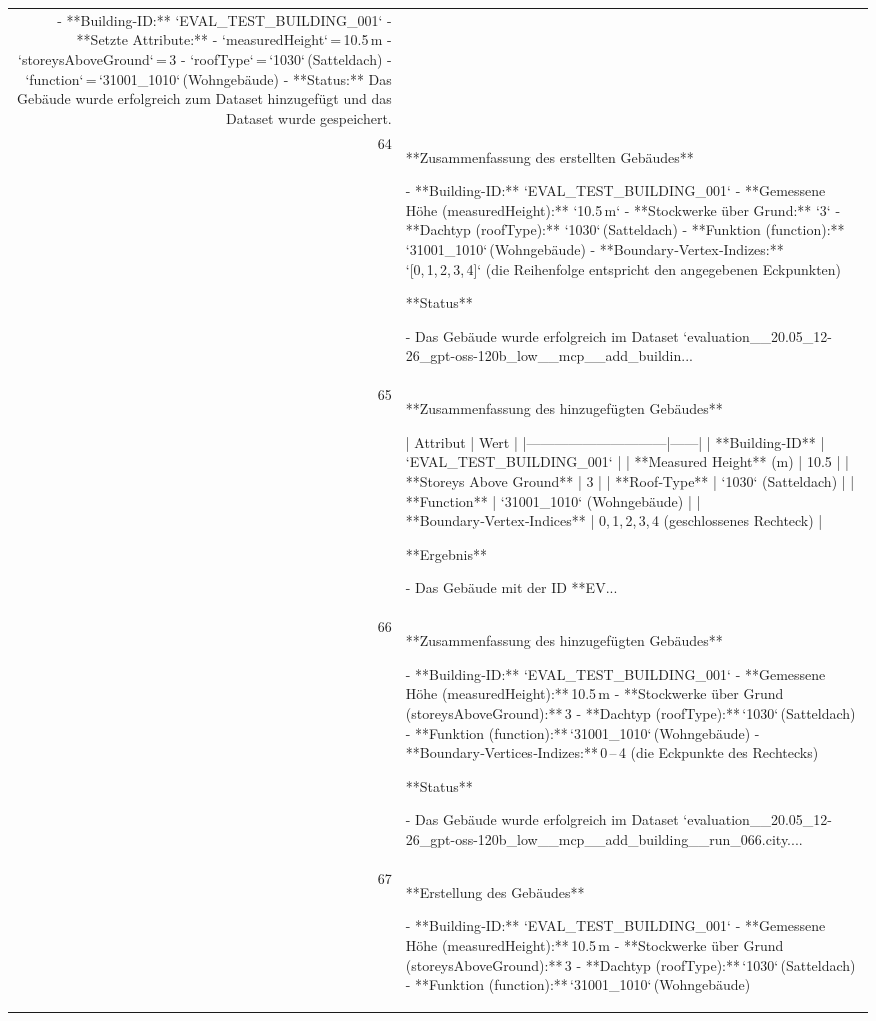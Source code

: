 \documentclass[a4paper,11pt]{article}
\begin{document}
\begin{table}[ht]
\begin{tabular}{r p{12cm}}
- **Building-ID:** `EVAL\_TEST\_BUILDING\_001`  
- **Setzte Attribute:**  
  - `measuredHeight` = 10.5 m  
  - `storeysAboveGround` = 3  
  - `roofType` = `1030` (Satteldach)  
  - `function` = `31001\_1010` (Wohngebäude)  
- **Status:** Das Gebäude wurde erfolgreich zum Dataset hinzugefügt und das Dataset wurde gespeichert. \\
64 & **Zusammenfassung des erstellten Gebäudes**

- **Building-ID:** `EVAL\_TEST\_BUILDING\_001`  
- **Gemessene Höhe (measuredHeight):** `10.5 m`  
- **Stockwerke über Grund:** `3`  
- **Dachtyp (roofType):** `1030` (Satteldach)  
- **Funktion (function):** `31001\_1010` (Wohngebäude)  
- **Boundary‑Vertex‑Indizes:** `[0, 1, 2, 3, 4]` (die Reihenfolge entspricht den angegebenen Eckpunkten)

**Status**

- Das Gebäude wurde erfolgreich im Dataset `evaluation\_\_20.05\_12-26\_gpt-oss-120b\_low\_\_mcp\_\_add\_buildin... \\
65 & **Zusammenfassung des hinzugefügten Gebäudes**

| Attribut                     | Wert |
|------------------------------|------|
| **Building‑ID**              | `EVAL\_TEST\_BUILDING\_001` |
| **Measured Height** (m)      | 10.5 |
| **Storeys Above Ground**     | 3 |
| **Roof‑Type**                | `1030` (Satteldach) |
| **Function**                 | `31001\_1010` (Wohngebäude) |
| **Boundary‑Vertex‑Indices**  | 0, 1, 2, 3, 4 (geschlossenes Rechteck) |

**Ergebnis**

- Das Gebäude mit der ID **EV... \\
66 & **Zusammenfassung des hinzugefügten Gebäudes**

- **Building‑ID:** `EVAL\_TEST\_BUILDING\_001`  
- **Gemessene Höhe (measuredHeight):** 10.5 m  
- **Stockwerke über Grund (storeysAboveGround):** 3  
- **Dachtyp (roofType):** `1030` (Satteldach)  
- **Funktion (function):** `31001\_1010` (Wohngebäude)  
- **Boundary‑Vertices‑Indizes:** 0 – 4 (die Eckpunkte des Rechtecks)

**Status**

- Das Gebäude wurde erfolgreich im Dataset `evaluation\_\_20.05\_12-26\_gpt-oss-120b\_low\_\_mcp\_\_add\_building\_\_run\_066.city.... \\
67 & **Erstellung des Gebäudes**

- **Building‑ID:** `EVAL\_TEST\_BUILDING\_001`  
- **Gemessene Höhe (measuredHeight):** 10.5 m  
- **Stockwerke über Grund (storeysAboveGround):** 3  
- **Dachtyp (roofType):** `1030` (Satteldach)  
- **Funktion (function):** `31001\_1010` (Wohngebäude)  


\end{tabular}
\end{table}
\end{document}
